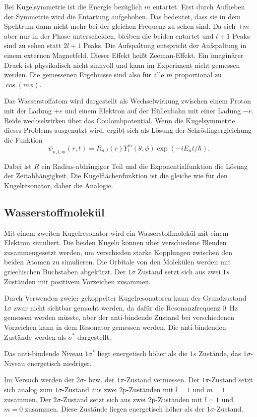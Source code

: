Bei Kugelsymmetrie ist die Energie bezüglich $m$ entartet. 
Erst durch Aufheben der Symmetrie wird die Entartung aufgehoben.  
Das bedeutet, dass sie in dem Spektrum dann nicht mehr bei der gleichen Frequenz zu sehen sind. Da sich $\pm m$ aber nur in der Phase unterscheiden, bleiben die beiden entartet und $l+1$ Peaks sind zu sehen statt $2l+1$ Peaks.
Die Aufspaltung entspricht der Aufspaltung in einem externen Magnetfeld. Dieser Effekt heißt Zeeman-Effekt.
Ein imaginärer Druck ist physikalisch nicht sinnvoll und kann im Experiment nicht gemessen werden. Die gemessenen Ergebnisse sind also für alle $m$ proportional zu $\cos(m\phi)$. 

Das Wasserstoffatom wird dargestellt als Wechselwirkung zwischen einem Proton mit der Ladung $+e$ und einem Elektron auf der Hüllenbahn mit einer Ladung $-e$. Beide wechselwirken über das Coulombpotential. Wenn die Kugelsymmetrie dieses Problems ausgenutzt wird, ergibt sich als Lösung der Schrödingergleichung die Funktion 
\begin{equation*}
    \psi_{n,l,m} (r,t) = R_{n,l}(r) Y_{l}^m(\theta, \phi) \exp(-i E_n t/\hbar).
\end{equation*}

Dabei ist $R$ ein Radius-abhängiger Teil und die Exponentialfunktion die Lösung der Zeitabhängigkeit. 
Die Kugelflächenfunktion ist die gleiche wie für den Kugelresonator, daher die Analogie.

\subsection{Wasserstoffmolekül}
\label{sec:Wasserstoffmolekül}

Mit einem zweiten Kugelresonator wird ein Wasserstoffmolekül mit einem Elektron simuliert. 
Die beiden Kugeln können über verschiedene Blenden zusammengesetzt werden, um verschieden starke Kopplungen zwischen den beiden Atomen zu simulieren. 
Die Orbitale von den Molekülen werden mit griechischen Buchstaben abgekürzt. Der $1\sigma$ Zustand setzt sich aus zwei $1s$ Zuständen mit positivem Vorzeichen zusammen. \cite{QM2}

Durch Verwenden zweier gekoppelter Kugelresonatoren kann der Grundzustand $1\sigma$ zwar nicht sichtbar gemacht werden, da dafür die Resonanzfrequenz \SI{0}{\hertz} gemessen werden müsste, aber der anti-bindende Zustand bei verschiedenen Vorzeichen kann in dem Resonator gemessen werden. Die anti-bindenden Zustände werden als $\sigma^*$ dargestellt. 

Das anti-bindende Niveau $1\sigma^*$ liegt energetisch höher als die $1s$ Zustände, das $1\sigma$-Niveau energetisch niedriger. \cite{QM2}

Im Versuch werden der $2\sigma$- bzw. der $1\pi$-Zustand vermessen. Der $1\pi$-Zustand setzt sich analog zum $1\sigma$-Zustand aus zwei $\num{2}$p-Zuständen mit $l= \num{1}$ und $m= \num{1}$ zusammen. Der $2\sigma$-Zustand setzt sich aus zwei $\num{2}$p-Zuständen mit $l=\num{1}$ und $m=\num{0}$ zusammen. Diese Zustände liegen energetisch höher als der $1\sigma$-Zustand. \cite{QM2}








